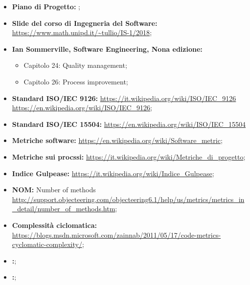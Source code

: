 \begin{itemize}
	\item \textbf{Piano di Progetto:} \PdP;
	\item \textbf{Slide del corso di Ingegneria del Software:}\newline
		  		 \url{https://www.math.unipd.it/~tullio/IS-1/2018};
	\item \textbf{Ian Sommerville, Software Engineering, Nona edizione:}
		\begin{itemize}
		  	\item Capitolo 24: Quality management;
		  	\item Capitolo 26: Process improvement;
		\end{itemize}
	\item \textbf{Standard ISO/IEC 9126:}\newline
		  		  \url{https://it.wikipedia.org/wiki/ISO/IEC_9126}\newline
				  \url{https://en.wikipedia.org/wiki/ISO/IEC_9126};
	\item \textbf{Standard ISO/IEC 15504:}\newline
				  \url{https://en.wikipedia.org/wiki/ISO/IEC_15504}
	\item \textbf{Metriche software:}\newline
				  \url{https://en.wikipedia.org/wiki/Software_metric};
	\item \textbf{Metriche sui procssi:}\newline
				  \url{https://it.wikipedia.org/wiki/Metriche_di_progetto};
	\item \textbf{Indice Gulpease:}\newline
				 \url{https://it.wikipedia.org/wiki/Indice_Gulpease};
	\item \textbf{NOM:} Number of methods\newline
				  \url{http://support.objecteering.com/objecteering6.1/help/us/metrics/metrics_in_detail/number_of_methods.htm};
	\item \textbf{Complessità ciclomatica: }\newline
				 \url{https://blogs.msdn.microsoft.com/zainnab/2011/05/17/code-metrics-cyclomatic-complexity/};
	\item \textbf{:};
	\item \textbf{:};
		
\end{itemize}